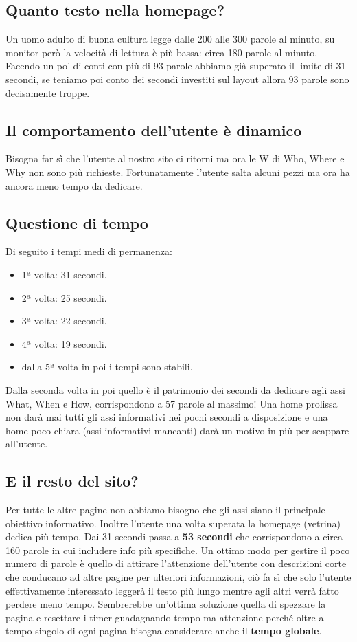 			\subsection{Quanto testo nella homepage?} Un uomo adulto di buona cultura legge dalle 200 alle 300 parole al minuto, su monitor però la velocità di lettura è più bassa: circa 180 parole al minuto. Facendo un po' di conti con più di 93 parole abbiamo già superato il limite di 31 secondi, se teniamo poi conto dei secondi investiti sul layout allora 93 parole sono decisamente troppe.
			\subsection{Il comportamento dell'utente è dinamico} Bisogna far sì che l'utente al nostro sito ci ritorni ma ora le W di Who, Where e Why non sono più richieste. Fortunatamente l'utente salta alcuni pezzi ma ora ha ancora meno tempo da dedicare.
			
		\subsection{Questione di tempo}	
			Di seguito i tempi medi di permanenza:
			\begin{itemize}
				\item 1ª volta: 31 secondi.
				\item 2ª volta: 25 secondi.
				\item 3ª volta: 22 secondi.
				\item 4ª volta: 19 secondi.
				\item dalla 5ª volta in poi i tempi sono stabili.
			\end{itemize}
			Dalla seconda volta in poi quello è il patrimonio dei secondi da dedicare agli assi What, When e How, corrispondono a 57 parole al massimo!
			Una home prolissa non darà mai tutti gli assi informativi nei pochi secondi a disposizione e una home poco chiara (assi informativi mancanti) darà un motivo in più per scappare all'utente.
			
		\subsection{E il resto del sito?}
			Per tutte le altre pagine non abbiamo bisogno che gli assi siano il principale obiettivo informativo. Inoltre l'utente una volta superata la homepage (vetrina) dedica più tempo. Dai 31 secondi passa a \textbf{53 secondi} che corrispondono a circa 160 parole in cui includere info più specifiche.
			Un ottimo modo per gestire il poco numero di parole è quello di attirare l'attenzione dell'utente con descrizioni corte che conducano ad altre pagine per ulteriori informazioni, ciò fa sì che solo l'utente effettivamente interessato leggerà il testo più lungo mentre agli altri verrà fatto perdere meno tempo.
			Sembrerebbe un'ottima soluzione quella di spezzare la pagina e resettare i timer guadagnando tempo ma attenzione perché oltre al tempo singolo di ogni pagina bisogna considerare anche il \textbf{tempo globale}.
			
